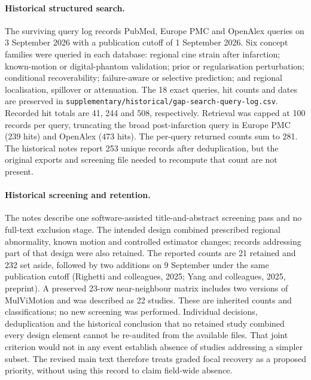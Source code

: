 \documentclass[11pt,a4paper]{article}
\begin{document}
\paragraph{Historical structured search.} The surviving query log records PubMed, Europe PMC and OpenAlex queries on 3 September 2026 with a publication cutoff of 1 September 2026. Six concept families were queried in each database: regional cine strain after infarction; known-motion or digital-phantom validation; prior or regularisation perturbation; conditional recoverability; failure-aware or selective prediction; and regional localisation, spillover or attenuation. The 18 exact queries, hit counts and dates are preserved in \texttt{supplementary/historical/gap-search-query-log.csv}. Recorded hit totals are 41, 244 and 508, respectively. Retrieval was capped at 100 records per query, truncating the broad post-infarction query in Europe PMC (239 hits) and OpenAlex (473 hits). The per-query returned counts sum to 281. The historical notes report 253 unique records after deduplication, but the original exports and screening file needed to recompute that count are not present.

\paragraph{Historical screening and retention.} The notes describe one software-assisted title-and-abstract screening pass and no full-text exclusion stage. The intended design combined prescribed regional abnormality, known motion and controlled estimator changes; records addressing part of that design were also retained. The reported counts are 21 retained and 232 set aside, followed by two additions on 9 September under the same publication cutoff (Righetti and colleagues, 2025; Yang and colleagues, 2025, preprint). A preserved 23-row near-neighbour matrix includes two versions of MulViMotion and was described as 22 studies. These are inherited counts and classifications; no new screening was performed. Individual decisions, deduplication and the historical conclusion that no retained study combined every design element cannot be re-audited from the available files. That joint criterion would not in any event establish absence of studies addressing a simpler subset. The revised main text therefore treats graded focal recovery as a proposed priority, without using this record to claim field-wide absence.
\end{document}
